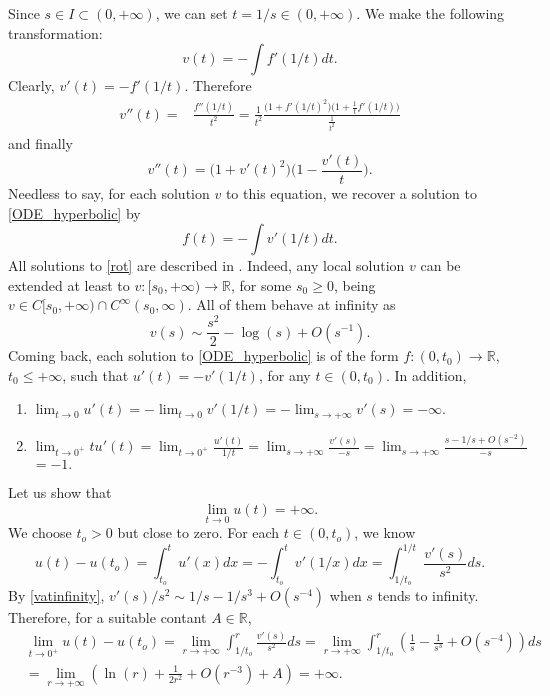 \documentclass[12pt]{article}
\numberwithin{lemma}{section}
\newcommand{\R}{\mathbb{R}}
\begin{document}
{Since $s\in I\subset(0,+\infty)$, we can set $t=1/s\in(0,+\infty)$. We make the following transformation:
\[ v(t) = -\int f'(1/t)dt. 
\]
Clearly, $v'(t)=-f'(1/t)$. Therefore %
\begin{align*} 
v''(t) = & \frac{f''(1/t)}{t^2} = 
\frac{1}{t^ 2}\frac{ \Big( 1+f'(1/t)^2\Big)\Big( 1+\frac{1}{t}f'(1/t)\Big)}{ \frac{1}{t^2} } 
\end{align*}
and finally
\begin{equation}\label{rot} v''(t) = \Big( 1+v'(t)^2\Big) \Big ( 1 - \frac{v'(t)}{t}\Big).
\end{equation}
Needless to say, for each solution $v$ to this equation, we recover a solution to  \eqref{ODE_hyperbolic} by 
\[ f(t) = -\int v'(1/t)dt.\]
All solutions to \eqref{rot} are described in \cite{CSS}. Indeed, any local solution $v$ can be extended at least to  $v:[s_0,+\infty)\rightarrow\R$, for some $s_0\geq 0$, being $v\in C[s_0,+\infty)\cap C^{\infty}(s_0,\infty)$. %
All of them behave at infinity as 
\begin{equation}\label{vatinfinity}
v(s)\sim \frac{s^2}{2} - \log(s) + O(s^{-1}).
\end{equation}
Coming back, each solution to \eqref{ODE_hyperbolic} is of the form $f:(0,t_0)\rightarrow\R$,  $t_0\leq +\infty$, such that $u'(t)=-v'(1/t)$, for any $t\in (0,t_0)$. In addition, 
\begin{enumerate}
\item $\lim_{t\to 0} u'(t)=- \lim_{t\to 0} v'(1/t) = -\lim_{s\to +\infty} v'(s) = -\infty$. 
\item $\lim_{t\to 0^+} t u'(t) = \lim_{t\to 0^+}\frac{u'(t)}{1/t} = \lim_{s\to +\infty} \frac{v'(s)}{-s} = \lim_{s\to +\infty} \frac{s-1/s+O(s^{-2})}{-s}$ $= -1.$
\end{enumerate}

Let us show that 
\[ \lim_{t\to 0} u(t) = +\infty.\] 
We choose $t_o>0$ but close to zero. For each $t\in (0,t_o)$, we know
\[ u(t) - u(t_o)=\int_{t_o}^t u'(x)dx = - \int_{t_o}^t v'(1/x)dx = \int_{1/t_o}^{1/t} \frac{v'(s)}{s^2}ds.
\]
By \eqref{vatinfinity}, $v'(s)/s^2 \sim 1/s - 1/s^3+O(s^{-4})$ when $s$ tends to infinity. Therefore, for a suitable contant $A\in\R$, 
\begin{align*}
& \lim_{t\to 0^{+}} u(t)-u(t_o) = \lim_{r\to +\infty} \int_{1/t_o}^r \frac{v'(s)}{s^2}ds 
=  \lim_{r\to +\infty} \int_{1/t_o}^r \left(\frac1s -\frac{1}{s^3}+O(s^{-4})\right) ds\\
& = \lim_{r\to +\infty} \left( \ln(r) +\frac{1}{2r^2}+O(r^{-3})+A\right)  = +\infty. 
\end{align*}

}
\end{document}
